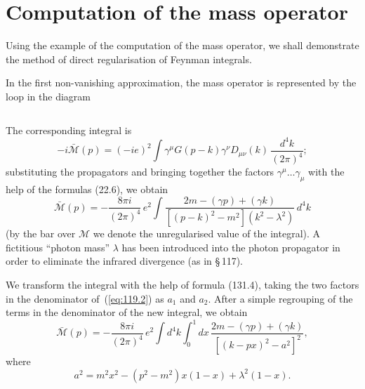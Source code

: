 
\section{Computation of the mass operator}


Using the example of the computation of the mass operator, we shall demonstrate the method of direct regularisation of Feynman integrals.

In the first non-vanishing approximation, the mass operator is represented by the loop in the diagram


\begin{equation}
\label{eq:119.1}
\end{equation}

\noindent The corresponding integral is
\[
-i\bar{\mathcal{M}}(p) = (-ie)^2 \int \gamma^\mu G(p-k)\gamma^\nu D_{\mu\nu}(k)\,\frac{d^4k}{(2\pi)^4};
\]
substituting the propagators and bringing together the factors $\gamma^\mu \dots \gamma_\mu$ with the help of the formulas (22.6), we obtain
\begin{equation}
\bar{\mathcal{M}}(p) = -\frac{8\pi i}{(2\pi)^4}\,e^2 \int \frac{2m - (\gamma p) + (\gamma k)}{[(p-k)^2 - m^2](k^2 - \lambda^2)}\,d^4k
\label{eq:119.2}
\end{equation}
(by the bar over $\mathcal{M}$ we denote the unregularised value of the integral). A fictitious ``photon mass'' $\lambda$ has been introduced into the photon propagator in order to eliminate the infrared divergence (as in \S\,117).

We transform the integral with the help of formula (131.4), taking the two factors in the denominator of~(\ref{eq:119.2}) as $a_1$ and $a_2$. After a simple regrouping of the terms in the denominator of the new integral, we obtain
\begin{equation}
\bar{\mathcal{M}}(p) = -\frac{8\pi i}{(2\pi)^4}\,e^2 \int d^4k \int_0^1 dx\,\frac{2m - (\gamma p) + (\gamma k)}{[(k - px)^2 - a^2]^2},
\label{eq:119.3}
\end{equation}
where
\begin{equation}
a^2 = m^2 x^2 - (p^2 - m^2)x(1-x) + \lambda^2(1-x).
\label{eq:119.4}
\end{equation}

